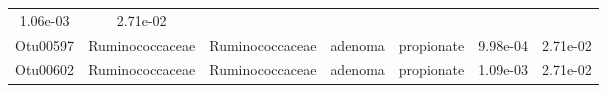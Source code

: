 \documentclass[11pt,]{article}
\begin{document}
\begin{longtable}[]{@{}ccccccc@{}}
\begin{minipage}[t]{0.09\columnwidth}
1.06e-03\strut
\end{minipage} & \begin{minipage}[t]{0.09\columnwidth}\centering\strut
2.71e-02\strut
\end{minipage}\tabularnewline
\begin{minipage}[t]{0.09\columnwidth}\centering\strut
Otu00597\strut
\end{minipage} & \begin{minipage}[t]{0.17\columnwidth}\centering\strut
Ruminococcaceae\strut
\end{minipage} & \begin{minipage}[t]{0.17\columnwidth}\centering\strut
Ruminococcaceae\strut
\end{minipage} & \begin{minipage}[t]{0.09\columnwidth}\centering\strut
adenoma\strut
\end{minipage} & \begin{minipage}[t]{0.11\columnwidth}\centering\strut
propionate\strut
\end{minipage} & \begin{minipage}[t]{0.09\columnwidth}\centering\strut
9.98e-04\strut
\end{minipage} & \begin{minipage}[t]{0.09\columnwidth}\centering\strut
2.71e-02\strut
\end{minipage}\tabularnewline
\begin{minipage}[t]{0.09\columnwidth}\centering\strut
Otu00602\strut
\end{minipage} & \begin{minipage}[t]{0.17\columnwidth}\centering\strut
Ruminococcaceae\strut
\end{minipage} & \begin{minipage}[t]{0.17\columnwidth}\centering\strut
Ruminococcaceae\strut
\end{minipage} & \begin{minipage}[t]{0.09\columnwidth}\centering\strut
adenoma\strut
\end{minipage} & \begin{minipage}[t]{0.11\columnwidth}\centering\strut
propionate\strut
\end{minipage} & \begin{minipage}[t]{0.09\columnwidth}\centering\strut
1.09e-03\strut
\end{minipage} & \begin{minipage}[t]{0.09\columnwidth}\centering\strut
2.71e-02\strut
\end{minipage}\tabularnewline

\end{longtable}
\end{document}
